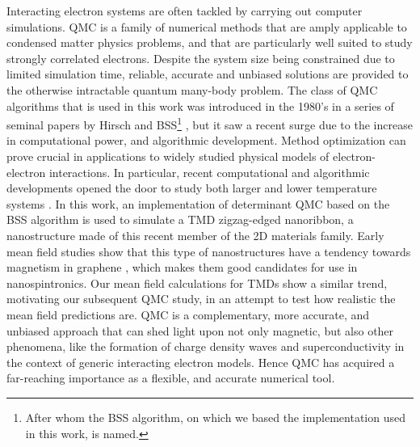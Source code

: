 Interacting electron systems are often tackled by carrying out computer simulations.
\ac{QMC} is a family of numerical methods that are  amply applicable to condensed matter physics problems, and that are particularly well suited to study strongly correlated electrons.
Despite the system size being constrained due to limited simulation time, reliable, accurate and unbiased solutions are provided to the otherwise intractable quantum many-body problem.
The class of \acs{QMC} algorithms that is used in this work was introduced in the 1980's in a series of seminal papers by Hirsch and \acl{BSS}\footnote{After whom the \ac{BSS} algorithm, on which we based the implementation used in this work, is named.} \cite{hirsch_discrete_1983, hirsch_monte_1982, blankenbecler_monte_1981, hirsch_two-dimensional_1985, hirsch_monte_1983, hirsch_stable_1988, hirsch_antiferromagnetism_1989}, but it saw a recent surge \cite{dumitrescu_superconductivity_2016, berg_monte_2018, beyl_revisiting_2018, chang_recent_2015, esterlis_breakdown_2018, mondaini_determinant_2012, meng_characterization_2014, kung_characterizing_2016, johnston_determinant_2013, rademaker_determinant_2013, ying_determinant_2014, scalettar_numerical_2007, zhou_quantum_2014} due to the increase in computational power, and algorithmic development.
Method optimization can prove crucial in applications to widely studied physical models of electron-electron interactions.
In particular, recent computational and algorithmic developments opened the door to study both larger and lower temperature systems \cite{jiang_fast_2016, lee_parallelization_2010, chang_recent_2015, bai_stable_2011}.
In this work, an implementation of determinant \acs{QMC} based on the \ac{BSS} algorithm is used to simulate a \ac{TMD} zigzag-edged nanoribbon, a nanostructure made of this recent member of the \acs{2D} materials family.
Early mean field studies show that this type of nanostructures have a tendency towards magnetism in graphene \cite{yazyev_emergence_2010}, which makes them good candidates for use in nanospintronics.
Our mean field calculations for \acp{TMD} show a similar trend, motivating our subsequent \acs{QMC} study, in an attempt to test how realistic the mean field predictions are.
\acs{QMC} is a complementary, more accurate, and unbiased approach that can shed light upon not only magnetic, but also  other phenomena, like the formation of charge density waves and superconductivity in the context of generic interacting electron models. Hence \acs{QMC} has acquired a far-reaching importance as a flexible, and accurate numerical tool.